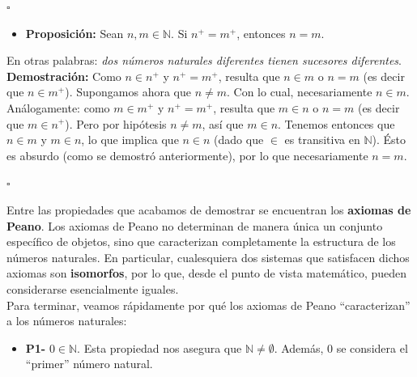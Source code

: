 \documentclass[10 pt]{article}
\begin{document}
{\begin{flushright}
    $\square$
\end{flushright}

\begin{itemize}
    \item \Large{\textbf{Proposición:} Sean $n,m \in \mathbb N$. Si $n^+=m^+$, entonces $n=m$.} \\
\end{itemize}

\Large{En otras palabras: \textit{dos números naturales diferentes tienen sucesores diferentes}.} \\

\Large{\textbf{Demostración:} Como $n \in n^+$ y $n^+=m^+$, resulta que $n \in m$ o $n=m$ (es decir que $n \in m^+$). Supongamos ahora que $n \neq m$. Con lo cual, necesariamente $n \in m$. Análogamente: como $m \in m^+$ y $n^+=m^+$, resulta que $m \in n$ o $n=m$ (es decir que $m \in n^+$). Pero por hipótesis $n \neq m$, así que $m \in n$. Tenemos entonces que $n \in m$ y $m \in n$, lo que implica que $n \in n$ (dado que $\in$ es transitiva en $\mathbb N$). Ésto es absurdo (como se demostró anteriormente), por lo que necesariamente $n=m$.} \\

\begin{flushright}
    $\square$
\end{flushright}

\Large{Entre las propiedades que acabamos de demostrar se encuentran los \textbf{axiomas de Peano}. Los axiomas de Peano no determinan de manera única un conjunto específico de objetos, sino que caracterizan completamente la estructura de los números naturales. En particular, cualesquiera dos sistemas que satisfacen dichos axiomas son \textbf{isomorfos}, por lo que, desde el punto de vista matemático, pueden considerarse esencialmente iguales. \\

Para terminar, veamos rápidamente por qué los axiomas de Peano ``caracterizan'' a los números naturales:} \\

\begin{itemize}
    \item \Large{\textbf{P1-} $0 \in \mathbb N$. Esta propiedad nos asegura que $\mathbb N \neq \emptyset$. Además, $0$ se considera el ``primer'' número natural.} \\
\end{itemize}

}
\end{document}
